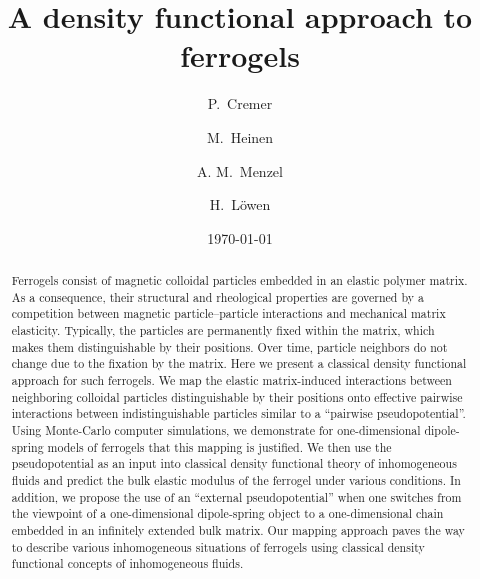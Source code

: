 \documentclass[aps,pre,twocolumn,superscriptaddress,nofootinbib]{revtex4}
\begin{document}
\title{A density functional approach to ferrogels}

\author{P.\ Cremer}
%
\author{M.\ Heinen}
%
\author{A. M.\ Menzel}
%
\author{H.\ L\"owen}
%
%
\date{\today}
%

\begin{abstract}
Ferrogels consist of magnetic colloidal particles embedded in an elastic polymer matrix. 
As a consequence, their structural and rheological properties are governed by a competition between magnetic particle--particle interactions and mechanical matrix elasticity. 
Typically, the particles are permanently fixed within the matrix, which makes them distinguishable by their positions. 
Over time, particle neighbors do not change due to the fixation by the matrix. 
Here we present a classical density functional approach for such ferrogels. 
We map the elastic matrix-induced interactions between neighboring colloidal particles distinguishable by their positions onto effective pairwise interactions between indistinguishable particles similar to  a ``pairwise pseudopotential''.
Using Monte-Carlo computer simulations, we demonstrate for one-dimensional dipole-spring models of ferrogels that this mapping is justified.
We then use the pseudopotential as an input into classical density functional theory of inhomogeneous fluids and predict the bulk elastic modulus of the ferrogel under various conditions. 
In addition, we propose the use of an ``external pseudopotential'' when one switches from the viewpoint of a one-dimensional dipole-spring object to a one-dimensional chain embedded in an infinitely extended bulk matrix. 
Our mapping approach paves the way to describe various inhomogeneous situations of ferrogels using classical density functional concepts of inhomogeneous fluids. 
\end{abstract}
\end{document}
